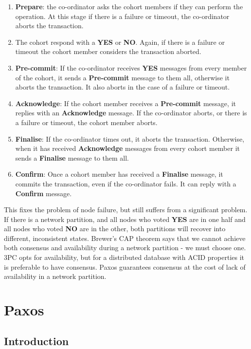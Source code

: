\documentclass[12pt,twoside,notitlepage]{report}
\newcommand{\msg}[1] {{\bf #1}}         %
\begin{document}
\begin{enumerate}
\item \msg{Prepare}: the co-ordinator asks the cohort members if they can perform the operation. At
	this stage if there is a failure or timeout, the co-ordinator aborts the transaction.
\item The cohort respond with a \msg{YES} or \msg{NO}. Again, if there is a failure or timeout the cohort
	member considers the transaction aborted.
\item \msg{Pre-commit}: If the co-ordinator receives \msg{YES} messages from every member of the
	cohort, it sends a \msg{Pre-commit} message to them all, otherwise it aborts the
	transaction. It also aborts in the case of a failure or timeout.
\item \msg{Acknowledge}: If the cohort member receives a \msg{Pre-commit} message, it replies with
	an \msg{Acknowledge} message. If the co-ordinator aborts, or there is a failure or
	timeout, the cohort member aborts.
\item \msg{Finalise}: If the co-ordinator times out, it aborts the transaction. Otherwise, when it
	has received \msg{Acknowledge} messages from every cohort member it sends a \msg{Finalise}
	message to them all.
\item \msg{Confirm}: Once a cohort member has received a \msg{Finalise} message, it commits the
	transaction, even if the co-ordinator fails. It can reply with a \msg{Confirm} message.
\end{enumerate}

This fixes the problem of node failure, but still suffers from a significant problem. If there is
a network partition, and all nodes who voted \msg{YES} are in one half and all nodes who voted
\msg{NO} are in the other, both partitions will recover into different, inconsistent states.
Brewer's CAP theorem \cite{gilbert2002} says that we cannot achieve both consensus and availability
during a network partition - we must choose one. 3PC opts for availability, but for a distributed
database with ACID properties it is preferable to have consensus. Paxos guarantees consensus at
the cost of lack of availability in a network partition.

\section{Paxos}

\subsection{Introduction}
\end{document}
